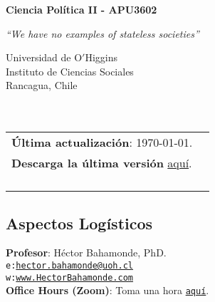 \documentclass[letterpaper]{article}
\def\name{Ciencia Pol\'itica II - APU3602}
\begin{document}

\centerline{\huge \bf \name}

\epigraph{\emph{``We have no examples of stateless societies''}}{\textcite[195]{Mann1984}}


\vspace{0.25in}

\begin{minipage}{0.45\linewidth}
 Universidad de O$'$Higgins \\
  Instituto de Ciencias Sociales \\
  Rancagua, Chile\\
  \\
  \\

\end{minipage}
\hspace{4cm}\begin{minipage}{0.45\linewidth}
  \begin{tabular}{ll}
{\bf \'Ultima actualizaci\'on}: \today. \\
 {\bf Descarga la \'ultima versi\'on} \href{https://github.com/hbahamonde/Ciencia_Politica_II/raw/master/Bahamonde_Ciencia_Politica_II.pdf}{aqu\'i}.%
    \\
    \\
    \\
    \\
    \\
  \end{tabular}
\end{minipage}



\subsection*{Aspectos Log\'isticos}


\vspace{1mm}
{\bf Profesor}: H\'ector Bahamonde, PhD.\\
\texttt{e:}\href{mailto:hector.bahamonde@uoh.cl}{\texttt{hector.bahamonde@uoh.cl}}\\
\texttt{w:}\href{http://www.hectorbahamonde.com}{\texttt{www.HectorBahamonde.com}}\\
{\bf Office Hours (Zoom)}: Toma una hora \href{https://calendly.com/bahamonde/officehours}{\texttt{aqu\'i}}.
\end{document}
